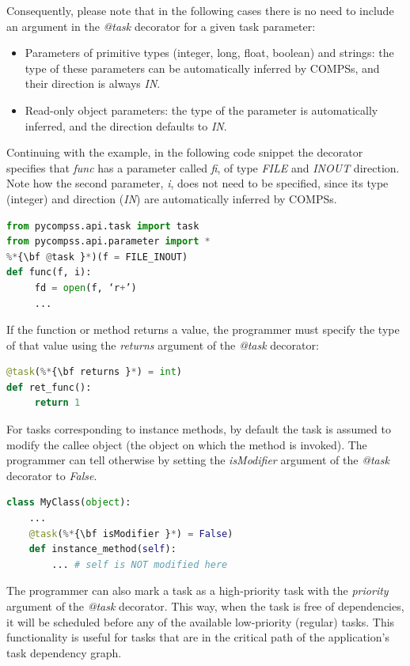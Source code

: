Consequently, please note that in the following cases there is no need to include an argument in 
the {\it @task} decorator for a given task parameter:

\begin{itemize}
 \item Parameters of primitive types (integer, long, float, boolean) and strings: the type of these 
       parameters can be automatically inferred by COMPSs, and their direction is always {\it IN}.
 \item Read-only object parameters: the type of the parameter is automatically inferred, and the 
       direction defaults to {\it IN}.
\end{itemize}
 
Continuing with the example, in the following code snippet the decorator specifies that {\it func} 
has a parameter called {\it fi}, of type {\it FILE} and {\it INOUT} direction. Note how the second 
parameter, {\it i}, does not need to be specified, since its type (integer) and direction ({\it IN}) 
are automatically inferred by COMPSs.

\begin{lstlisting}[language=python]
from pycompss.api.task import task
from pycompss.api.parameter import *
%*{\bf @task }*)(f = FILE_INOUT)
def func(f, i):
     fd = open(f, ‘r+’)
     ...
\end{lstlisting}

If the function or method returns a value, the programmer must specify the type of that value using 
the {\it returns} argument of the {\it @task} decorator:

\begin{lstlisting}[language=python]
@task(%*{\bf returns }*) = int)
def ret_func():
     return 1
\end{lstlisting}

For tasks corresponding to instance methods, by default the task is assumed to modify the callee object 
(the object on which the method is invoked). The programmer can tell otherwise by setting the 
{\it isModifier} argument of the {\it @task} decorator to {\it False}.

\begin{lstlisting}[language=python]
class MyClass(object):
    ...
    @task(%*{\bf isModifier }*) = False)
    def instance_method(self):
        ... # self is NOT modified here
\end{lstlisting}

The programmer can also mark a task as a high-priority task with the {\it priority} argument of the 
{\it @task} decorator. This way, when the task is free of dependencies, it will be scheduled before 
any of the available low-priority (regular) tasks. This functionality is useful for tasks that are in 
the critical path of the application’s task dependency graph.

